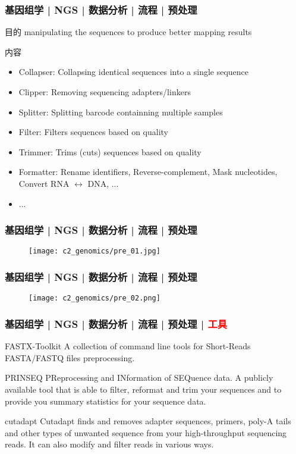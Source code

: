 \begin{frame}
  \frametitle{基因组学 | NGS | 数据分析 | 流程 | 预处理}
  \begin{block}{目的}
 manipulating the sequences to produce better mapping results
  \end{block}
  \pause
  \begin{block}{内容}
    \begin{itemize}
      \item Collapser: Collapsing identical sequences into a single sequence
      \item Clipper: Removing sequencing adapters/linkers
      \item Splitter: Splitting barcode containning multiple samples
      \item Filter: Filters sequences based on quality
      \item Trimmer: Trims (cuts) sequences based on quality
      \item Formatter: Rename identifiers, Reverse-complement, Mask nucleotides, Convert RNA $\leftrightarrow$ DNA, ...
      \item ...
    \end{itemize}
  \end{block}
\end{frame}

\begin{frame}
  \frametitle{基因组学 | NGS | 数据分析 | 流程 | 预处理}
  \begin{figure}
    \centering
    \texttt{[image: c2\_genomics/pre\_01.jpg]}
  \end{figure}
\end{frame}

\begin{frame}
  \frametitle{基因组学 | NGS | 数据分析 | 流程 | 预处理}
  \begin{figure}
    \centering
    \texttt{[image: c2\_genomics/pre\_02.png]}
  \end{figure}
\end{frame}

\begin{frame}
  \frametitle{基因组学 | NGS | 数据分析 | 流程 | 预处理 | \textcolor{red}{工具}}
  \begin{block}{FASTX-Toolkit}
    A collection of command line tools for Short-Reads FASTA/FASTQ files preprocessing.
  \end{block}
  \pause
  \begin{block}{PRINSEQ}
    PReprocessing and INformation of SEQuence data. A publicly available tool that is able to filter, reformat and trim your sequences and to provide you summary statistics for your sequence data.
  \end{block}
  \pause
  \begin{block}{cutadapt}
    Cutadapt finds and removes adapter sequences, primers, poly-A tails and other types of unwanted sequence from your high-throughput sequencing reads. It can also modify and filter reads in various ways.
  \end{block}
\end{frame}

